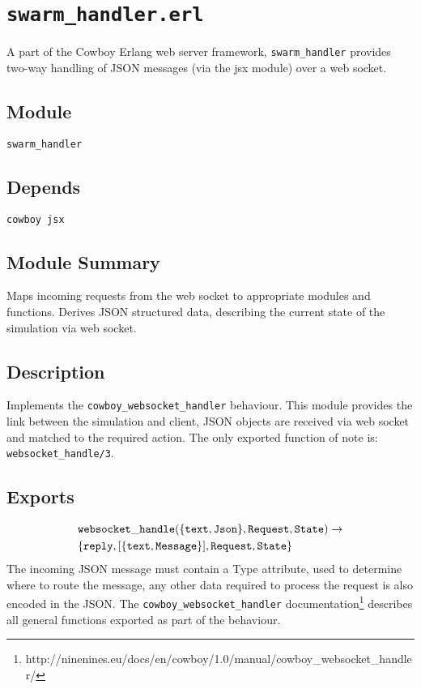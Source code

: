 \pagestyle{empty}
\section{\tt swarm\_handler.erl}
A part of the Cowboy Erlang web server framework, \verb+swarm_handler+ provides two-way handling of JSON messages (via the jsx module) over a web socket.
\subsection{Module}
\verb+swarm_handler+
\subsection{Depends}
{\tt cowboy \linebreak
jsx}
\subsection{Module Summary}
Maps incoming requests from the web socket to appropriate modules and functions.
Derives JSON structured data, describing the current state of the simulation via web socket.
\subsection{Description}
Implements the \verb+cowboy_websocket_handler+ behaviour.
This module provides the link between the simulation and client, JSON objects are received via web socket and matched to the required action. The only exported function of note is: \linebreak
\verb+websocket_handle/3+.
\subsection{Exports}
\begin{align*}& \tt {websocket\_handle(\{text,Json\},Request,State)}\rightarrow \\ 
& \tt \{reply, [\{text,Message\}], Request, State\}\end{align*} 
The incoming JSON message must contain a Type attribute, used to determine where to route the message, any other data required to process the request is also encoded in the JSON.\linebreak
The \verb+cowboy_websocket_handler+ documentation\footnote{http://ninenines.eu/docs/en/cowboy/1.0/manual/cowboy\_websocket\_handler/}
 describes all general functions exported as part of the behaviour.
\clearpage
\endinput
